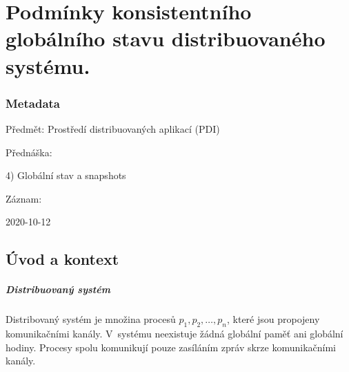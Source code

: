 

\chapter{Podmínky konsistentního globálního stavu distribuovaného systému.}



\subsection*{Metadata}

\begin{compactitem}
    \item Předmět: Prostředí distribuovaných aplikací (PDI)
    \item Přednáška:
    \begin{compactitem}
        \item 4) Globální stav a snapshots
    \end{compactitem}
    \item Záznam:
    \begin{compactitem}
        \item 2020-10-12
    \end{compactitem}
\end{compactitem}


\section{Úvod a kontext}

\paragraph*{Distribuovaný systém} Distribovaný systém je množina procesů $p_1, p_2, \dots, p_n$, které jsou propojeny komunikačními kanály. V~systému neexistuje žádná globální paměť ani globální hodiny. Procesy spolu komunikují pouze zasíláním zpráv skrze komunikačními kanály.

